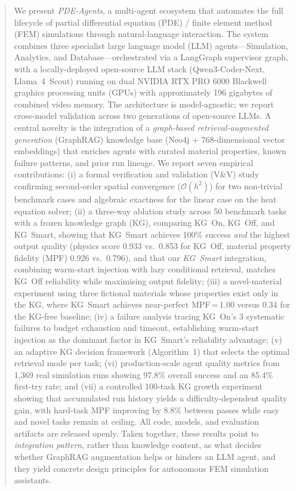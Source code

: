 \documentclass[preprint,review,12pt]{elsarticle}
\newif\ifrevisionsvisible
\newcommand{\revised}[1]{%
  \ifrevisionsvisible\textcolor{revisionred}{#1}\else#1\fi}
\begin{document}
\begin{frontmatter}
\begin{abstract}
We present \textit{PDE-Agents}, a multi-agent ecosystem that automates the
full lifecycle of partial differential equation (PDE) / finite element method
(FEM) simulations through natural-language interaction.  The system combines
three specialist large language model (LLM) agents---Simulation, Analytics,
and Database---orchestrated via a LangGraph supervisor graph, with a
locally-deployed open-source LLM stack (Qwen3-Coder-Next, Llama~4~Scout)
running on dual NVIDIA RTX PRO 6000 Blackwell graphics processing units
(GPUs) with approximately 196 gigabytes of combined video memory.  The
architecture is model-agnostic; we report cross-model validation across two
generations of open-source LLMs.
A central novelty is the integration of a \emph{graph-based
retrieval-augmented generation} (GraphRAG) knowledge base (Neo4j +
768-dimensional vector embeddings) that enriches agents with curated material
properties, known failure patterns, and prior run lineage.
We report seven empirical contributions: (i) a formal verification and
validation (V\&V) study confirming second-order spatial convergence
(\(\mathcal{O}(h^2)\)) for two non-trivial benchmark cases and algebraic
exactness for the linear case on the heat equation solver; (ii) a three-way
ablation study across 50 benchmark tasks with a frozen knowledge graph (KG),
comparing KG~On, KG~Off, and KG~Smart, showing that KG~Smart achieves
100\% success \emph{and} the highest output quality (physics score 0.933
vs.\ 0.853 for KG~Off, material property fidelity (MPF) 0.926 vs.\ 0.796),
and that our \emph{KG~Smart} integration, combining warm-start injection
with lazy conditional retrieval, matches KG~Off reliability while maximising
output fidelity; (iii) a novel-material experiment using three fictional
materials whose properties exist only in the KG, where KG~Smart achieves
near-perfect MPF\,=\,1.00 versus 0.34 for the KG-free baseline; (iv) a
failure analysis tracing KG~On's 3 systematic failures to budget exhaustion
and timeout, establishing warm-start injection as the dominant factor in
KG~Smart's reliability advantage; (v) an adaptive KG decision framework
(Algorithm~1) that selects the optimal retrieval mode per task; (vi)
production-scale agent quality metrics from 1{,}369 real simulation runs
showing 97.8\% overall success and \revised{an 85.4\%} first-try rate; and
(vii) a controlled 100-task KG growth experiment showing that accumulated
run history yields a difficulty-dependent quality gain, with hard-task MPF
improving by 8.8\% between passes while easy and novel tasks remain at
ceiling.  All code, models, and evaluation artifacts are released openly.
Taken together, these results point to \emph{integration pattern}, rather
than knowledge content, as what decides whether GraphRAG augmentation helps
or hinders an LLM agent, and they yield concrete design principles for
autonomous FEM simulation assistants.
\end{abstract}


\end{frontmatter}
\end{document}
